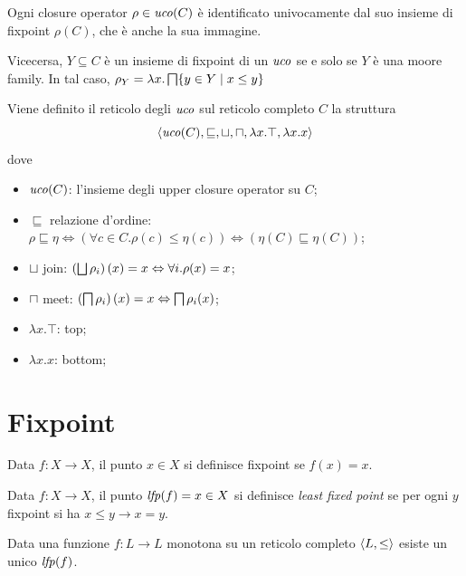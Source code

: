 \begin{theorem}
Ogni closure operator $\rho \in \mathit{uco}(C)$ è identificato univocamente dal suo insieme di fixpoint $\rho(C)$, che è anche la sua immagine.

Vicecersa, $Y \subseteq C$ è un insieme di fixpoint di un $\mathit{uco}$ se e solo se $Y$ è una moore family. In tal caso, $\rho_Y = \lambda x . \meet[\{y \in Y \; | \; x \le y\}]$
\end{theorem}

\begin{definition}
Viene definito il reticolo degli $\mathit{uco}$ sul reticolo completo $C$ la struttura
$$\struct{\uco(C), \sqsubseteq, \join, \meet, \lambda x . \top, \lambda x . x}$$
dove
\begin{itemize}
    \item $\mathit{uco}(C)$: l'insieme degli upper closure operator su $C$;
    \item $\sqsubseteq$ relazione d'ordine: $\rho \sqsubseteq \eta 
        \Leftrightarrow \left(\forall c \in C . \rho(c) \le \eta(c) \right)
        \Leftrightarrow \left(\eta(C) \sqsubseteq \eta(C) \right)$;
    \item $\join$ join: $\left(\join[\rho_i]\right)(x) = x \Leftrightarrow \forall i . \rho(x) = x$;
    \item $\meet$ meet: $\left(\meet[\rho_i]\right)(x) = x \Leftrightarrow \meet[\rho_i(x)]$;
    \item $\lambda x . \top$: top;
    \item $\lambda x . x$: bottom;
\end{itemize}
\end{definition}

\section{Fixpoint}

\begin{definition}[Fixpoint]
Data $f:X \to X$, il punto $x \in X$ si definisce fixpoint se $f(x) = x$.
\end{definition}

\begin{definition}
Data $f:X \to X$, il punto $\mathit{lfp}(f) = x \in X$ si definisce \emph{least fixed point} se per ogni $y$ fixpoint si ha $x \le y \to x = y$.
\end{definition}

\begin{theorem}
Data una funzione $f:L \to L$ monotona su un reticolo completo $\langle L, \le \rangle$ esiste un unico $\mathit{lfp}(f)$.
\end{theorem}

